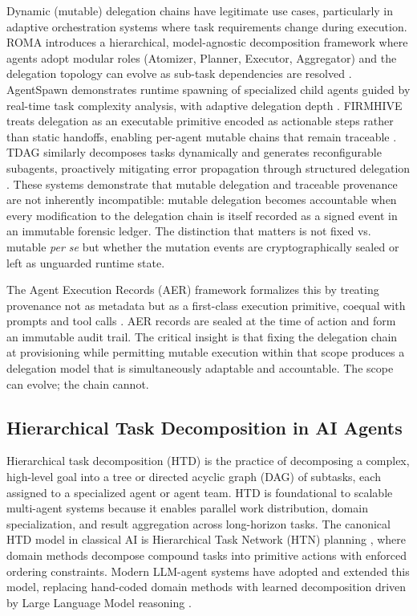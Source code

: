 Dynamic (mutable) delegation chains have legitimate use cases, particularly in adaptive orchestration systems where task requirements change during execution. ROMA introduces a hierarchical, model-agnostic decomposition framework where agents adopt modular roles (Atomizer, Planner, Executor, Aggregator) and the delegation topology can evolve as sub-task dependencies are resolved \cite{roma2025}. AgentSpawn demonstrates runtime spawning of specialized child agents guided by real-time task complexity analysis, with adaptive delegation depth \cite{agentspawn2026}. FIRMHIVE treats delegation as an executable primitive encoded as actionable steps rather than static handoffs, enabling per-agent mutable chains that remain traceable \cite{firmhive2025}. TDAG similarly decomposes tasks dynamically and generates reconfigurable subagents, proactively mitigating error propagation through structured delegation \cite{tdag2025}. These systems demonstrate that mutable delegation and traceable provenance are not inherently incompatible: mutable delegation becomes accountable when every modification to the delegation chain is itself recorded as a signed event in an immutable forensic ledger. The distinction that matters is not fixed vs. mutable \emph{per se} but whether the mutation events are cryptographically sealed or left as unguarded runtime state.

The Agent Execution Records (AER) framework formalizes this by treating provenance not as metadata but as a first-class execution primitive, coequal with prompts and tool calls \cite{aer2025}. AER records are sealed at the time of action and form an immutable audit trail. The critical insight is that fixing the delegation chain at provisioning while permitting mutable execution within that scope produces a delegation model that is simultaneously adaptable and accountable. The scope can evolve; the chain cannot.

\subsection{Hierarchical Task Decomposition in AI Agents}
\label{sec:htd}

Hierarchical task decomposition (HTD) is the practice of decomposing a complex, high-level goal into a tree or directed acyclic graph (DAG) of subtasks, each assigned to a specialized agent or agent team. HTD is foundational to scalable multi-agent systems because it enables parallel work distribution, domain specialization, and result aggregation across long-horizon tasks. The canonical HTD model in classical AI is Hierarchical Task Network (HTN) planning \cite{htn1993,htn2000}, where domain methods decompose compound tasks into primitive actions with enforced ordering constraints. Modern LLM-agent systems have adopted and extended this model, replacing hand-coded domain methods with learned decomposition driven by Large Language Model reasoning \cite{hiplan2025,reactree2025,structuredagent2025}.

